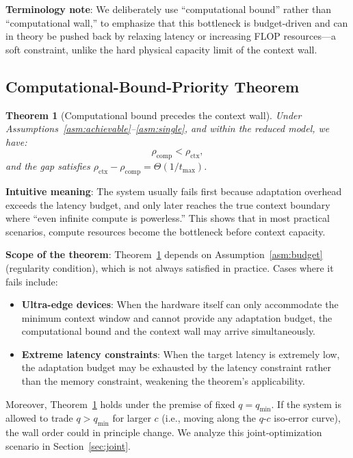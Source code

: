 \documentclass[11pt,a4paper]{article}
\theoremstyle{plain}
\newtheorem{theorem}{Theorem}
\theoremstyle{definition}
\begin{document}
\noindent\textbf{Terminology note}: We deliberately use ``computational bound'' rather than ``computational wall,'' to emphasize that this bottleneck is budget-driven and can in theory be pushed back by relaxing latency or increasing FLOP resources---a soft constraint, unlike the hard physical capacity limit of the context wall.

\subsection{Computational-Bound-Priority Theorem}

\begin{theorem}[Computational bound precedes the context wall]\label{thm:priority}
Under Assumptions~\ref{asm:achievable}--\ref{asm:single}, and within the reduced model, we have:
\[
\rho_{\text{comp}} < \rho_{\text{ctx}},
\]
and the gap satisfies $\rho_{\text{ctx}} - \rho_{\text{comp}} = \Theta(1 / t_{\max})$.
\end{theorem}

\noindent\textbf{Intuitive meaning}: The system usually fails first because adaptation overhead exceeds the latency budget, and only later reaches the true context boundary where ``even infinite compute is powerless.'' This shows that in most practical scenarios, compute resources become the bottleneck before context capacity.

\noindent\textbf{Scope of the theorem}: Theorem~\ref{thm:priority} depends on Assumption~\ref{asm:budget} (regularity condition), which is not always satisfied in practice. Cases where it fails include:
\begin{itemize}
    \item \textbf{Ultra-edge devices}: When the hardware itself can only accommodate the minimum context window and cannot provide any adaptation budget, the computational bound and the context wall may arrive simultaneously.
    \item \textbf{Extreme latency constraints}: When the target latency is extremely low, the adaptation budget may be exhausted by the latency constraint rather than the memory constraint, weakening the theorem's applicability.
\end{itemize}
Moreover, Theorem~\ref{thm:priority} holds under the premise of fixed $q = q_{\min}$. If the system is allowed to trade $q > q_{\min}$ for larger $c$ (i.e., moving along the $q$-$c$ iso-error curve), the wall order could in principle change. We analyze this joint-optimization scenario in Section~\ref{sec:joint}.
\end{document}
